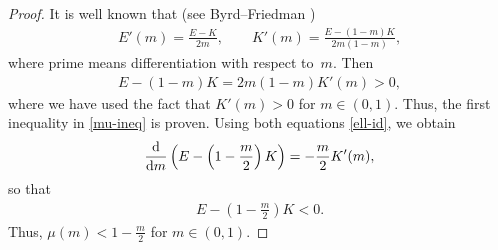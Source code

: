 \documentclass[10pt,a4paper]{amsart}
\numberwithin{equation}{section}
\begin{document}
\begin{proof}It is well known that (see Byrd--Friedman \cite[formulas~(710.00) and (710.02)]{BFbook})
\begin{align}\label{ell-id}
E'(m)=\frac{E-K}{2m},\qquad K'(m)=\frac{E-(1-m)K}{2m(1-m)},
\end{align}
where prime means differentiation with respect to~$m$. Then
\begin{align*}
E-(1-m)K=2m(1-m)K'(m)>0,
\end{align*}
where we have used the fact that $K'(m)>0$ for $m\in (0,1)$. Thus, the first inequality in \eqref{mu-ineq} is proven.
Using both equations \eqref{ell-id}, we obtain
\begin{align*}
\frac{{\rm d}}{{\rm d}m}\left(E-\left(1-\frac{m}{2}\right)K\right)=-\frac{m}{2}K'(m),
\end{align*}
so that
\begin{align*}
E-\left(1-\frac{m}{2}\right)K<0.
\end{align*}
Thus, $\mu(m)<1-\frac{m}{2}$ for $m\in (0,1)$.
\end{proof}
\end{document}

